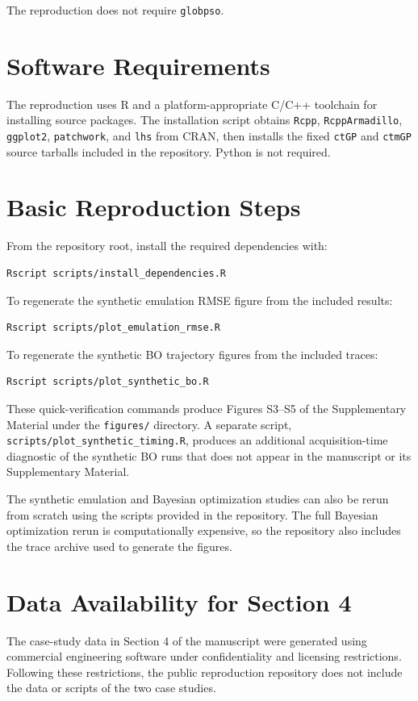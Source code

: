 \documentclass[11pt]{article}
\begin{document}
The reproduction does not require \texttt{globpso}.

\section*{Software Requirements}

The reproduction uses R and a platform-appropriate C/C++ toolchain for installing source packages. The installation script obtains \texttt{Rcpp}, \texttt{RcppArmadillo}, \texttt{ggplot2}, \texttt{patchwork}, and \texttt{lhs} from CRAN, then installs the fixed \texttt{ctGP} and \texttt{ctmGP} source tarballs included in the repository. Python is not required.

\section*{Basic Reproduction Steps}

From the repository root, install the required dependencies with:

\begin{verbatim}
Rscript scripts/install_dependencies.R
\end{verbatim}

To regenerate the synthetic emulation RMSE figure from the included results:

\begin{verbatim}
Rscript scripts/plot_emulation_rmse.R
\end{verbatim}

To regenerate the synthetic BO trajectory figures from the included traces:

\begin{verbatim}
Rscript scripts/plot_synthetic_bo.R
\end{verbatim}

These quick-verification commands produce Figures S3--S5 of the Supplementary Material under the \texttt{figures/} directory. A separate script, \texttt{scripts/plot\_synthetic\_timing.R}, produces an additional acquisition-time diagnostic of the synthetic BO runs that does not appear in the manuscript or its Supplementary Material.

The synthetic emulation and Bayesian optimization studies can also be rerun from scratch using the scripts provided in the repository. The full Bayesian optimization rerun is computationally expensive, so the repository also includes the trace archive used to generate the figures.

\section*{Data Availability for Section 4}

The case-study data in Section 4 of the manuscript were generated using commercial engineering software under confidentiality and licensing restrictions. Following these restrictions, the public reproduction repository does not include the data or scripts of the two case studies.
\end{document}
